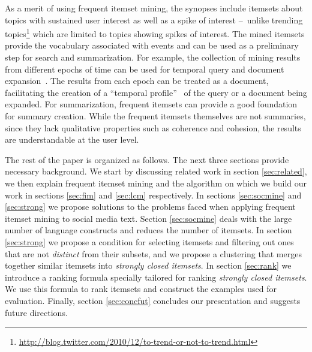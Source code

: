 \documentclass{sig-alternate}
\begin{document}
As a merit of using frequent itemset mining, the synopses include
itemsets about topics with sustained user interest as well as a spike of interest
--~unlike trending topics\footnote{\scriptsize \url{http://blog.twitter.com/2010/12/to-trend-or-not-to-trend.html}}
\cite{mathioudakis2010twittermonitor} which are limited to
topics showing spikes of interest.
The mined itemsets provide the vocabulary associated with events and can be
used as a preliminary step for search and summarization.
For example, the collection of mining results from different epochs of time
can be used for temporal query and document
expansion~\cite{choi2012temporal, efron2012improving}. 
The results from each epoch can be treated as a document, facilitating the
creation of a ``temporal profile''~\cite{jones2007temporal} of the query
or a document being expanded.
For summarization, frequent itemsets can provide a good foundation for summary
creation.
While the frequent itemsets themselves are not summaries, since they lack
qualitative properties such as coherence and cohesion, the results are
understandable at the user level.

The rest of the paper is organized as follows.
The next three sections provide necessary background.
We start by discussing related work in section \ref{sec:related},
we then explain frequent itemset mining and the algorithm on which we build
our work in sections \ref{sec:fim} and \ref{sec:lcm} respectively.
In sections \ref{sec:socmine} and \ref{sec:strong} we
propose solutions to the problems faced when applying frequent
itemset mining to social media text. 
Section \ref{sec:socmine} deals with the large number of language
constructs and reduces the number of itemsets.
In section  \ref{sec:strong} we propose a condition for selecting
itemsets and filtering out ones that are not \emph{distinct} from 
their subsets, and we propose a clustering that merges
together similar itemsets into \emph{strongly closed itemsets}.
In section \ref{sec:rank} we introduce a ranking formula
specially tailored for ranking \emph{strongly closed itemsets}.
We use this formula to rank itemsets and construct 
the examples used for evaluation. 
Finally, section \ref{sec:concfut} concludes our presentation and
suggests future directions.
\end{document}
